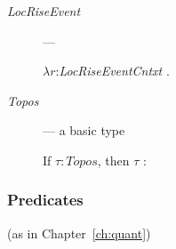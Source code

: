 \begin{description}
 \item[\textnormal{\textit{LocRiseEvent}}] ---

   $\lambda
r$:\textit{LocRiseEventCntxt} .\\  
\hspace*{2em}

      
    \item[\textnormal{\textit{Topos}}] --- a basic type

      If $\tau:\textit{Topos}$, then $\tau$ :  

                       


\end{description}

    \subsubsection{Predicates} (as in Chapter~\ref{ch:quant})


  


    




